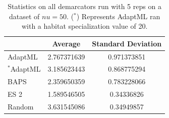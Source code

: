 \begin{table}
    \begin{tabular}{l|cc}
    ~                    & Average     & Standard Deviation \\ \hline
    AdaptML              & 2.767371639 & 0.971373851        \\
    $^\ast$AdaptML              & 3.185623443 & 0.868775294        \\
    BAPS                 & 2.359650359 & 0.783228066        \\
    ES 2 & 1.589546505 & 0.34336826         \\
    Random               & 3.631545086 & 0.34949857         \\
    \end{tabular}
    \caption[Statistics on all demarcators on $nu=50$.]{Statistics on all demarcators run with 5 reps on a dataset of $nu=50$. ($^\ast$) Represents AdaptML ran with a habitat specialization value of 20.}
        \label{tab:50Allmean}
\end{table}


